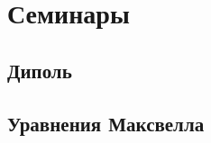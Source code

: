 
% 




\newpage


\newpage
\section{Семинары}

\subsection{Диполь}


\subsection{Уравнения Максвелла}


